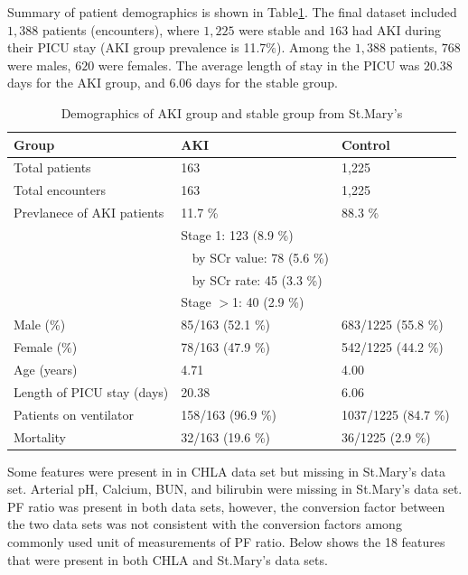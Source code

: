 \documentclass[
   technote
]{phildoc}
\newcommand{\fig}{Fig.}
\newcommand{\tab}{Table}
\begin{document}
Summary of patient demographics is shown in \tab \ref{tab:demographics_stm}. The final dataset included $1,388$ patients (encounters), where $1,225$ were stable and $163$ had AKI during their PICU stay (AKI group prevalence is 11.7$\%$). Among the $1,388$ patients,  $768$ were males, $620$ were females. The average length of stay in the PICU was $20.38$ days for the AKI group, and $6.06$ days for the stable group. 

\begin{table}[!htbp] \centering \caption{Demographics of AKI group and stable group from St.Mary's} \label{tab:demographics_stm}
\begin{tabular}{| l | l | l |}
\hline
\textbf{Group} & \textbf{AKI} & \textbf{Control}\\
\hline \hline
Total patients & 163 & 1,225 \\
\hline
Total encounters	&	163	& 	1,225  \\
\hline
Prevlanece of AKI patients
& 11.7 \% & 88.3 \% \\
& Stage 1: 123 (8.9 \%) & \\
& $\;\;$ by SCr value: 78 (5.6 \%) & \\
& $\;\;$ by SCr rate: 45 (3.3 \%) & \\
& Stage $>$1: 40 (2.9 \%) & \\
\hline
Male (\%) 			& 	85/163 (52.1 \%)		&	683/1225 (55.8 \%)	\\
\hline
Female (\%)		&	78/163 (47.9 \%)		&	542/1225 (44.2 \%)	 \\
\hline
Age (years)		&	4.71 	&	4.00  \\
\hline
Length of PICU stay (days)	& 20.38 &	6.06 \\
\hline
Patients on ventilator	& 158/163 (96.9 \%) &	1037/1225 (84.7 \%) \\
\hline
Mortality & 32/163 (19.6 \%) & 36/1225 (2.9 \%) \\
\hline
\end{tabular}
\end{table}

Some features were present in in CHLA data set but missing in St.Mary's data set. Arterial pH, Calcium, BUN, and bilirubin were missing in St.Mary's data set. PF ratio was present in both data sets, however, the conversion factor between the two data sets was not consistent with the conversion factors among commonly used unit of measurements of PF ratio. Below shows the 18 features that were present in both CHLA and St.Mary's data sets.
\end{document}

